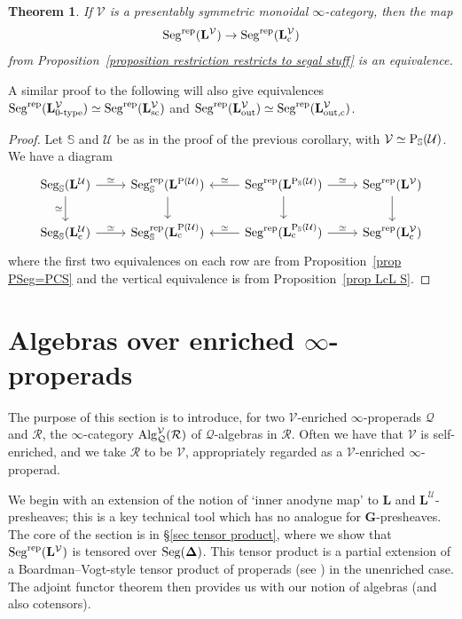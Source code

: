 \documentclass{amsart}
\newtheorem{theorem}{Theorem}
\numberwithin{theorem}{subsection}
\theoremstyle{definition}
\newcommand{\xU}{\mathcal{U}}
\newcommand{\xV}{\mathcal{V}}
\newcommand{\Pre}{\name{P}}
\newcommand{\PSU}{\Pre_{\mathbb{S}}(\xU)}
\newcommand{\icat}{$\infty$-category}
\newcommand{\name}[1]{\ensuremath{\text{\textup{#1}}}}
\newcommand{\simp}{\mathbf{\Delta}}
\newcommand{\levelg}{\mathbf{L}}
\newcommand{\levelV}{\levelg^\xV}
\newcommand{\levelU}{\levelg^\xU}
\newcommand{\levelgconn}{\levelg_{\name{c}}}
\newcommand{\levelPSU}{\levelg^{\PSU}}
\newcommand{\levelcPSU}{\levelgconn^{\PSU}}
\newcommand{\levelcV}{\levelgconn^{\xV}}
\newcommand{\levelcU}{\levelgconn^{\xU}}
\newcommand{\bbY}{\mathbf{G}}
\newcommand{\Seg}{\name{Seg}}
\newcommand{\Alg}{\name{Alg}}
\newcommand{\Segrep}{\Seg^{\name{rep}}}
\newcommand{\SegS}{\Seg_{\mathbb{S}}}
\newcommand{\SegrepS}{\Seg^{\name{rep}}_{\mathbb{S}}}
\begin{document}
\begin{theorem}
\label{theorem LcL Vrep}
If $\xV$ is a presentably symmetric monoidal $\infty$-category, then the map 
\[
	\Segrep(\levelV)\to\Segrep(\levelcV)
\]
from Proposition~\ref{proposition restriction restricts to segal stuff} is an equivalence.
\end{theorem}
A similar proof to the following will also give equivalences $\Segrep(\levelV_{\name{0-type}}) \simeq \Segrep(\levelV_{\name{sc}})$ and $\Segrep(\levelV_{\name{out}}) \simeq \Segrep(\levelV_{\name{out,c}})$.
\begin{proof}
Let $\mathbb{S}$ and $\xU$ be as in the proof of the previous corollary, with $\xV \simeq \PSU$.
We have a diagram
\[ \begin{tikzcd}
\SegS(\levelU) \dar[swap]{\simeq}  \rar{\simeq} & 
	\SegrepS(\levelg^{\Pre(\xU)}) \dar & 
	\Segrep(\levelPSU) \lar[swap]{\simeq} \dar \rar{\simeq} &
	\Segrep(\levelV) \dar \\
\SegS(\levelcU) \rar{\simeq} & 
	\SegrepS(\levelgconn^{\Pre(\xU)}) & 
	\Segrep(\levelcPSU) \lar[swap]{\simeq} \rar{\simeq} &
	\Segrep(\levelcV)
\end{tikzcd} \]
where the first two equivalences on each row are from Proposition~\ref{prop PSeg=PCS} and the vertical equivalence is from Proposition~\ref{prop LcL S}.
\end{proof}


\section{Algebras over enriched \texorpdfstring{$\infty$}{∞}-properads}\label{sec algebras over inf properads}

The purpose of this section is to introduce, for two $\xV$-enriched $\infty$-properads $\mathcal{Q}$ and $\mathcal{R}$, the \icat{} $\Alg^{\xV}_{\mathcal{Q}}(\mathcal{R})$ of  $\mathcal{Q}$-algebras in $\mathcal{R}$.
Often we have that $\xV$ is self-enriched, and we take $\mathcal{R}$ to be $\xV$, appropriately regarded as a $\xV$-enriched $\infty$-properad.

We begin with an extension of the notion of `inner anodyne map' to $\levelg$ and $\levelU$-presheaves; this is a key technical tool which has no analogue for $\bbY$-presheaves.
The core of the section is in \S\ref{sec tensor product}, where we show that $\Segrep(\levelV)$ is tensored over $\Seg(\simp)$.
This tensor product is a partial extension of a Boardman--Vogt-style tensor product of properads (see \cite[\S4]{hrybook}) in the unenriched case.
The adjoint functor theorem then provides us with our notion of algebras (and also cotensors).
\end{document}
